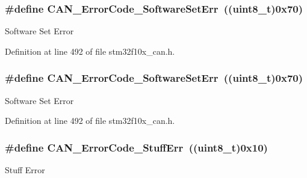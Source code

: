 \subsubsection[{\texorpdfstring{C\+A\+N\+\_\+\+Error\+Code\+\_\+\+Software\+Set\+Err}{CAN_ErrorCode_SoftwareSetErr}}]{\setlength{\rightskip}{0pt plus 5cm}\#define C\+A\+N\+\_\+\+Error\+Code\+\_\+\+Software\+Set\+Err~(({\bf uint8\+\_\+t})0x70)}\hypertarget{group___c_a_n___error___code__constants_ga927089dd74347b9fea7a7c59f3840a7c}{}\label{group___c_a_n___error___code__constants_ga927089dd74347b9fea7a7c59f3840a7c}
Software Set Error 

Definition at line 492 of file stm32f10x\+\_\+can.\+h.

\subsubsection[{\texorpdfstring{C\+A\+N\+\_\+\+Error\+Code\+\_\+\+Software\+Set\+Err}{CAN_ErrorCode_SoftwareSetErr}}]{\setlength{\rightskip}{0pt plus 5cm}\#define C\+A\+N\+\_\+\+Error\+Code\+\_\+\+Software\+Set\+Err~(({\bf uint8\+\_\+t})0x70)}\hypertarget{group___c_a_n___error___code__constants_ga927089dd74347b9fea7a7c59f3840a7c}{}\label{group___c_a_n___error___code__constants_ga927089dd74347b9fea7a7c59f3840a7c}
Software Set Error 

Definition at line 492 of file stm32f10x\+\_\+can.\+h.

\subsubsection[{\texorpdfstring{C\+A\+N\+\_\+\+Error\+Code\+\_\+\+Stuff\+Err}{CAN_ErrorCode_StuffErr}}]{\setlength{\rightskip}{0pt plus 5cm}\#define C\+A\+N\+\_\+\+Error\+Code\+\_\+\+Stuff\+Err~(({\bf uint8\+\_\+t})0x10)}\hypertarget{group___c_a_n___error___code__constants_gaa733d1c078472912c3bf60fbdc53734d}{}\label{group___c_a_n___error___code__constants_gaa733d1c078472912c3bf60fbdc53734d}
Stuff Error 

